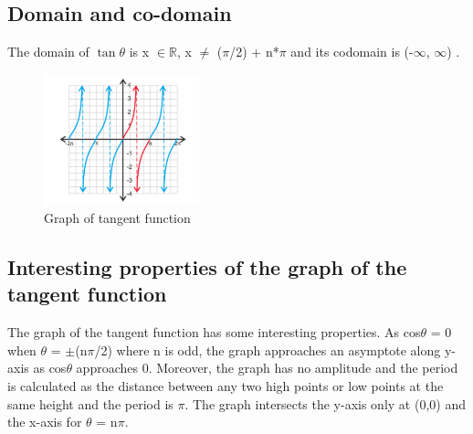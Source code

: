 \documentclass[12pt]{article}
\begin{document}
    \subsection{Domain and co-domain}
    The domain of $\tan \theta$ is x $\in \mathbb{R}$, x $\ne$ ($\pi$/2) + n*$\pi$ and its codomain is (-$\infty$, $\infty$) \cite{tandomainwebsite}.
    \begin{figure} [H]
        \centering
        \includegraphics[width=0.4\textwidth]{graph-of-tangent.png}
        \caption{Graph of tangent function}
        \label{fig:graph_tangent}
    \end{figure} 
    \subsection{Interesting properties of the graph of the tangent function}
    The graph of the tangent function has some interesting properties. As cos$\theta$ = 0 when $\theta$ = $\pm$(n$\pi$/2) where n is odd, the graph approaches an asymptote along y-axis as cos$\theta$ approaches 0. Moreover, the graph has no amplitude and the period is calculated as the distance between any two high points or low points at the same height and the period is $\pi$. The graph intersects the y-axis only at (0,0) and the x-axis for $\theta$ = n$\pi$.
    
    
    
\end{document}
